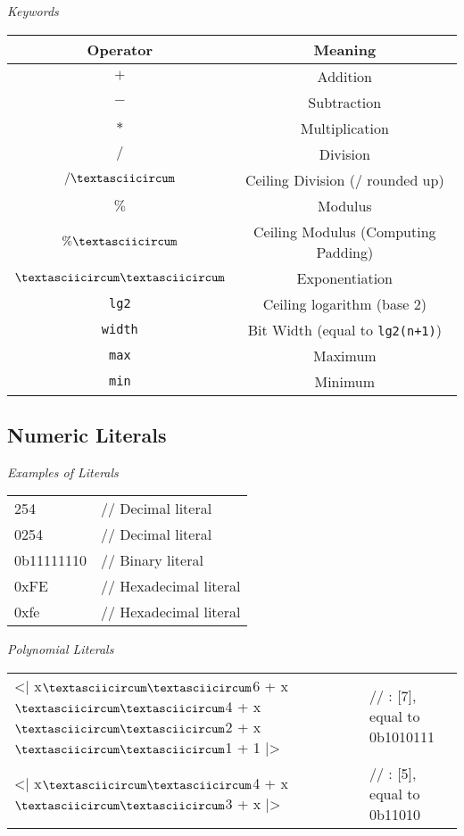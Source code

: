 \begin{table}[h!]
\begin{center}
\textit{Keywords}
\end{center}\centering
\begin{tabular}{|c|c|}\hline
\normalfont\textbf{Operator} & \normalfont\textbf{Meaning} \\
\midrule
$+$ & Addition \\
$-$ & Subtraction \\
$*$ & Multiplication \\
$/$ & Division \\
$\slash\textasciicircum$ & Ceiling Division ($/$ rounded up) \\
$\%$ & Modulus \\
$\%\textasciicircum$ & Ceiling Modulus (Computing Padding) \\
$\textasciicircum\textasciicircum$ & Exponentiation \\
\texttt{lg2} & Ceiling logarithm (base 2) \\
\texttt{width} & Bit Width (equal to \texttt{lg2(n+1)})  \\
\texttt{max} & Maximum \\
\texttt{min} & Minimum \\
\hline
\end{tabular}
\end{table}

\subsection*{Numeric Literals}
\begin{table}[h!]
\begin{center}
\textit{Examples of Literals}
\end{center}
{\ttfamily\begin{tabular}{ll}
254 & \textcolor{green!50!black}{// Decimal literal} \\
0254 & \textcolor{green!50!black}{// Decimal literal} \\
0b11111110 & \textcolor{green!50!black}{// Binary literal} \\
0xFE & \textcolor{green!50!black}{// Hexadecimal literal} \\
0xfe & \textcolor{green!50!black}{// Hexadecimal literal} \\
\end{tabular}}
\end{table}

\begin{table}[h!]
\begin{center}
\textit{Polynomial Literals}
\end{center}
{\ttfamily\begin{tabular}{ll}
<| x$\textasciicircum\textasciicircum$6 + x$\textasciicircum\textasciicircum$4 + x$\textasciicircum\textasciicircum$2 + x$\textasciicircum\textasciicircum$1 + 1 |> & \textcolor{green!50!black}{// : [7], equal to 0b1010111} \\
<| x$\textasciicircum\textasciicircum$4 + x$\textasciicircum\textasciicircum$3 + x |>  & \textcolor{green!50!black}{// : [5], equal to 0b11010}
\end{tabular}}
\end{table}

